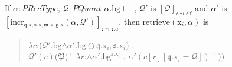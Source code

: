 \begin{ex} 




  If $\alpha:\textit{PRecType}$, $\mathcal{Q}:\textit{PQuant}$ 
  $\alpha.\text{bg}\sqsubseteq$ , $\mathcal{Q}'$ is
$[\mathcal{Q}]_{\mathfrak{c}\leadsto\mathfrak{c}.\text{f}}$ and
$\alpha'$ is
$[\mathrm{incr}_{\mathfrak{q}.\text{x},\mathfrak{s}.\text{x},\mathfrak{w}.\text{x},\mathfrak{g}.\text{x}}(\alpha,\mathcal{Q}')]_{\mathfrak{c}\leadsto\mathfrak{c}.a}$, then
  $\mathrm{retrieve}(\text{x}_i,\alpha)$ is
  \begin{quote}
    $\lambda
    c$:$(\mathcal{Q}'.\text{bg}$\d{$\wedge$}$\alpha'.\text{bg}\ominus\mathfrak{q}.\text{x}_i,\mathfrak{s}.\text{x}_i)$
    . \\ \hspace*{2em}$\mathcal{Q'}(c)(\mathfrak{P}(\ulcorner\lambda
    r$:\d{$\wedge$}$\alpha'.\text{bg}^{\mathfrak{s}.\text{x}_i}$
    . $\alpha'(c[r][\mathfrak{q}.\text{x}_i=\mathcal{Q}])\urcorner))$
  \end{quote}
  
\end{ex}

